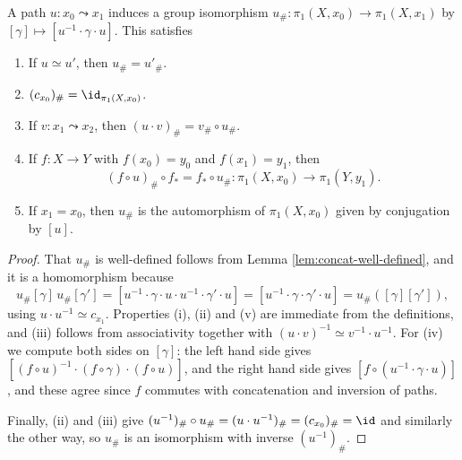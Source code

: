 \begin{proposition} \label{prop:change-basepoint}
	A path $u: x_0 \leadsto x_1$ induces a group isomorphism $u_\#: \pi_1(X, x_0) \rightarrow \pi_1(X, x_1)$ by $[\gamma] \mapsto [u^{-1} \cdot \gamma \cdot u]$. This satisfies
	\begin{enumerate}
		\item If $u \simeq u'$, then $u_\# = u'_\#$.
		\item $(c_{x_0})_\# = \id_{\pi_1(X, x_0)}$.
		\item If $v: x_1 \leadsto x_2$, then $(u \cdot v)_\# = v_\# \circ u_\#$.
		\item If $f: X \rightarrow Y$ with $f(x_0) = y_0$ and $f(x_1) = y_1$, then
		$$
		(f\circ u)_\# \circ f_* = f_* \circ u_\#: \pi_1(X, x_0) \rightarrow \pi_1(Y, y_1).
		$$
		\item If $x_1 = x_0$, then $u_\#$ is the automorphism of $\pi_1(X, x_0)$ given by conjugation by $[u]$.
	\end{enumerate}
\end{proposition}
\begin{proof}
	That $u_\#$ is well-defined follows from Lemma \ref{lem:concat-well-defined}, and it is a homomorphism because
	$$
	u_\#[\gamma] \, u_\#[\gamma'] = [u^{-1}\cdot\gamma\cdot u \cdot u^{-1} \cdot \gamma' \cdot u] = [u^{-1} \cdot \gamma \cdot \gamma' \cdot u] = u_\#([\gamma][\gamma']),
	$$
	using $u \cdot u^{-1} \simeq c_{x_1}$. Properties (i), (ii) and (v) are immediate from the definitions, and (iii) follows from associativity together with $(u\cdot v)^{-1} \simeq v^{-1} \cdot u^{-1}$. For (iv) we compute both sides on $[\gamma]$: the left hand side gives $[(f\circ u)^{-1} \cdot (f \circ \gamma) \cdot (f \circ u)]$, and the right hand side gives $[f \circ (u^{-1}\cdot\gamma\cdot u)]$, and these agree since $f$ commutes with concatenation and inversion of paths.

	Finally, (ii) and (iii) give $(u^{-1})_\# \circ u_\# = (u \cdot u^{-1})_\# = (c_{x_0})_\# = \id$ and similarly the other way, so $u_\#$ is an isomorphism with inverse $(u^{-1})_\#$.
\end{proof}

\begin{center}
\end{center}

